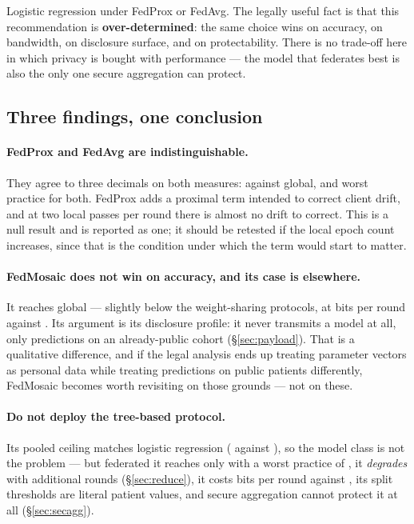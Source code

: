 \label{sec:modelchoice}
\statusMeasured

\begin{shortanswer}
Logistic regression under FedProx or FedAvg. The legally useful fact is that this recommendation is
\textbf{over-determined}: the same choice wins on accuracy, on bandwidth, on disclosure surface, and
on protectability. There is no trade-off here in which privacy is bought with performance --- the
model that federates best is also the only one secure aggregation can protect.
\end{shortanswer}

\subsection{Three findings, one conclusion}

\paragraph{FedProx and FedAvg are indistinguishable.} They agree to three decimals on both measures:
\BestFedAUC{} against \FedAvgAUC{} global, and \BestFedWorst{} worst practice for both. FedProx adds a proximal term
\cite{li2020fedprox} intended to correct client drift, and at two local passes per round there is
almost no drift to correct. This is a null result and is reported as one; it should be retested if
the local epoch count increases, since that is the condition under which the term would start to
matter.

\paragraph{FedMosaic does not win on accuracy, and its case is elsewhere.} It reaches \MosaicAUC{}
global --- slightly below the weight-sharing protocols, at \UplinkMosaic{} bits per round against
\UplinkLogreg{}. Its argument is its disclosure profile: it
never transmits a model at all, only predictions on an already-public cohort (\S\ref{sec:payload}).
That is a qualitative difference, and if the legal analysis ends up treating parameter vectors as
personal data while treating predictions on public patients differently, FedMosaic becomes worth
revisiting on those grounds --- not on these.

\paragraph{Do not deploy the tree-based protocol.} Its pooled ceiling matches logistic regression
(\CeilingXGB{} against \CeilingAUC{}), so the model class is not the problem --- but federated it
reaches only \XGBAUC{} with a worst practice of \XGBWorst{}, it \emph{degrades} with additional
rounds (\S\ref{sec:reduce}), it costs \UplinkXGB{} bits per round against \UplinkLogreg{}, its split
thresholds are literal patient values, and secure aggregation cannot protect it at all
(\S\ref{sec:secagg}).

